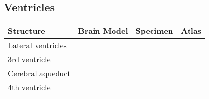 \documentclass[]{article}
\begin{document}
\hypertarget{ventricles}{%
\subsection{Ventricles}\label{ventricles}}

\begin{longtable}[]{@{}llll@{}}
\toprule
Structure & Brain Model & Specimen & Atlas\tabularnewline
\midrule
\endhead
\href{https://en.wikipedia.org/wiki/Lateral_ventricles}{Lateral
ventricles} & & &\tabularnewline
\href{https://en.wikipedia.org/wiki/Third_ventricle}{3rd ventricle} & &
&\tabularnewline
\href{https://en.wikipedia.org/wiki/Cerebral_aqueduct}{Cerebral
aqueduct} & & &\tabularnewline
\href{https://en.wikipedia.org/wiki/Fourth_ventricle}{4th ventricle} & &
&\tabularnewline
\bottomrule
\end{longtable}
\end{document}
